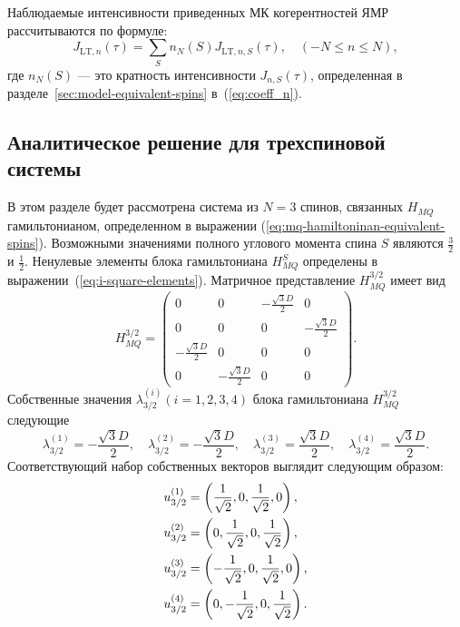 Наблюдаемые интенсивности приведенных МК когерентностей ЯМР рассчитываются по формуле:
%
\begin{equation}\label{eq:coherence_k}
  J_{\mathrm{LT}, n}(\tau) = \sum\limits_S n_N(S) J_{\mathrm{LT}, n, S}(\tau),
  \quad
  (-N\leq n \leq N),
\end{equation}
%
где $n_N(S)$ --- это кратность интенсивности $J_{n, S}(\tau)$,
определенная в разделе~\ref{sec:model-equivalent-spins} в~(\ref{eq:coeff_n}).


\subsection{Аналитическое решение для трехспиновой системы}
\label{sec:sec:nanopora-thermodynamic-equilibrium-exact_sol}

В этом разделе будет рассмотрена система из $N=3$ спинов,
связанных $H_{MQ}$ гамильтонианом,
определенном в выражении (\ref{eq:mq-hamiltoninan-equivalent-spins}).
Возможными значениями полного углового момента спина $S$
являются $\frac 3 2$ и $\frac 1 2$.
Ненулевые элементы блока гамильтониана $H_{MQ}^{S}$ определены в выражении~(\ref{eq:i-square-elements}).
Матричное представление $H_{MQ}^{3/2}$ имеет вид
%
\begin{equation}
    \label{eq:ham_3_2}
    H_{MQ}^{3/2} =
    \begin{pmatrix}
        0 & 0 & -\frac{\sqrt{3} D}{2} & 0 \\
        0 & 0 & 0 & -\frac{\sqrt{3} D}{2} \\
        -\frac{\sqrt{3} D}{2} & 0 & 0 & 0 \\
        0 & -\frac{\sqrt{3} D}{2} & 0 & 0
    \end{pmatrix}.
\end{equation}
%
Собственные значения $\lambda_{3/2}^{(i)}(i=1, 2, 3, 4)$
блока гамильтониана $H_{MQ}^{3/2}$ следующие
%
\begin{equation}\label{eq:eigvals_3_2}
  \lambda_{3/2}^{(1)} = -\frac{\sqrt{3} D}{2}, \quad
  \lambda_{3/2}^{(2)} = -\frac{\sqrt{3} D}{2}, \quad
  \lambda_{3/2}^{(3)} = \frac{\sqrt{3} D}{2}, \quad
  \lambda_{3/2}^{(4)} = \frac{\sqrt{3} D}{2}.
\end{equation}
%
Соответствующий набор собственных векторов выглядит следующим образом:
%
\begin{align}\label{eq:eigvecs_3_2}
  u_{3/2}^{(1)} & =  \left(\frac{1}{\sqrt{2}}, 0, \frac{1}{\sqrt{2}}, 0\right) ,
  \notag \\
  u_{3/2}^{(2)} & =  \left(0, \frac{1}{\sqrt{2}}, 0, \frac{1}{\sqrt{2}}\right) ,
  \notag \\
  u_{3/2}^{(3)} & =  \left(-\frac{1}{\sqrt{2}}, 0, \frac{1}{\sqrt{2}}, 0\right) ,
  \notag \\
  u_{3/2}^{(4)} & =  \left(0, -\frac{1}{\sqrt{2}}, 0, \frac{1}{\sqrt{2}}\right) .
\end{align}
